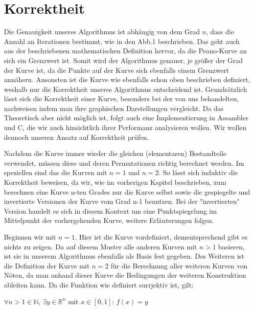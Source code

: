 \documentclass[course=asp]{aspdoc}
\begin{document}
\newpage

\section{Korrektheit} %

Die Genauigkeit unseres Algorithmus ist abhängig von dem Grad $n$, dass die Anzahl an Iterationen bestimmt, wie in den Abb.1 beschrieben. Das geht auch aus der beschriebenen mathematischen Definition hervor, da die Peano-Kurve an sich ein Grenzwert ist. Somit wird der Algorithmus genauer, je größer der Grad der Kurve ist, da die Punkte auf der Kurve sich ebenfalls einem Grenzwert annähern. Ansonsten ist die Kurve wie ebenfalls schon oben beschrieben definiert, weshalb nur die Korrektheit unseres Algorithmus entscheidend ist.
Grundsätzlich lässt sich die Korrektheit einer Kurve, besonders bei der von uns behandelten, nachweisen indem man ihre graphischen Darstellungen vergleicht. Da das Theoretisch aber nicht möglich ist, folgt auch eine Implementierung in Assambler und C, die wir auch hinsichtlich ihrer Performanz analysieren wollen.
Wir wollen dennoch unseren Ansatz auf Korrektheit prüfen.

Nachdem die Kurve immer wieder die gleichen (elementaren) Bestandteile verwendet, müssen diese und deren Permutationen richtig berechnet werden. Im speziellen sind das die Kurven mit $n = 1$ und $n = 2$. So lässt sich induktiv die Korrektheit beweisen, da wir, wie im vorherigen Kapitel beschrieben, zum berechnen eine Kurve n-ten Grades nur die Kurve selbst sowie die gespiegelte und invertierte Versionen der Kurve vom Grad n-1 benutzen. Bei der "invertierten" Version handelt es sich in diesem Kontext um eine Punktspiegelung im Mittelpunkt der vorhergehenden Kurve, weitere Erläuterungen folgen.

Beginnen wir mit $n = 1$. Hier ist die Kurve vordefiniert, dementsprechend gibt es nichts zu zeigen. Da auf diesem Muster alle anderen Kurven mit $n>1$ basieren, ist sie in unserem Algorithmus ebenfalls als Basis fest gegeben.
Des Weiteren ist die Definition der Kurve mit $n = 2$ für die Berechnung aller weiteren Kurven von Nöten, da man anhand dieser Kurve die Bedingungen der weiteren Konstruktion ableiten kann.
Da die Funktion wie definiert surrjektiv ist, gilt: 

$\forall n>1 \in \mathbb{N}$, $\exists y \in \mathbb{R}^n$ mit $x \in [0,1]$: $f(x)= y$	%
\end{document}
